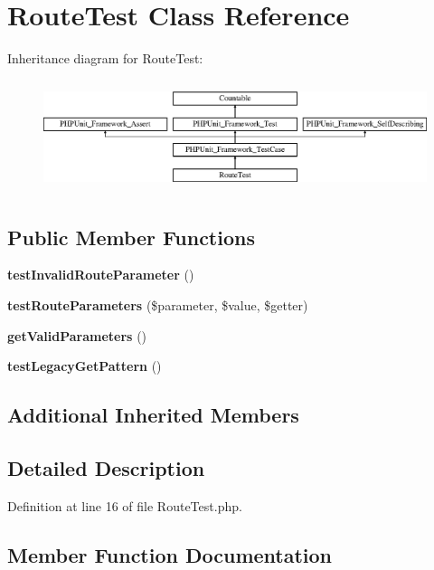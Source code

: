 \section{Route\+Test Class Reference}
\label{class_symfony_1_1_component_1_1_routing_1_1_tests_1_1_annotation_1_1_route_test}
Inheritance diagram for Route\+Test\+:\begin{figure}[H]
\begin{center}
\leavevmode
\includegraphics[height=3.303835cm]{class_symfony_1_1_component_1_1_routing_1_1_tests_1_1_annotation_1_1_route_test}
\end{center}
\end{figure}
\subsection*{Public Member Functions}
\begin{DoxyCompactItemize}
\item 
{\bf test\+Invalid\+Route\+Parameter} ()
\item 
{\bf test\+Route\+Parameters} (\$parameter, \$value, \$getter)
\item 
{\bf get\+Valid\+Parameters} ()
\item 
{\bf test\+Legacy\+Get\+Pattern} ()
\end{DoxyCompactItemize}
\subsection*{Additional Inherited Members}


\subsection{Detailed Description}


Definition at line 16 of file Route\+Test.\+php.



\subsection{Member Function Documentation}
